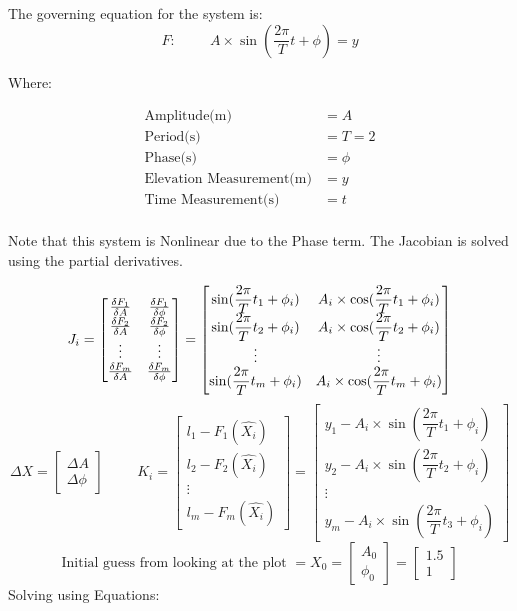 The governing equation for the system is:
\[
F:\hspace{1cm} A \times \sin(\dfrac{2\pi}{T}t + \phi) = y
\]

Where:

\begin{align*}
\text{Amplitude(m)} &= A \\
\text{Period(s)}    &= T = 2 \\
\text{Phase(s)}     &= \phi \\
\text{Elevation Measurement(m)} &= y \\
\text{Time Measurement(s)} &= t \\	
\end{align*}

Note that this system is Nonlinear due to the Phase term.  The Jacobian is solved using the partial derivatives.

\[
J_i = \begin{bmatrix}
	\frac{\delta F_1}{\delta A} &  \frac{\delta F_1}{\delta \phi} \\
	\frac{\delta F_2}{\delta A} & \frac{\delta F_2}{\delta \phi} \\
	\vdots & \vdots \\
	\frac{\delta F_m}{\delta A} & \frac{\delta F_m}{\delta \phi} \\
\end{bmatrix}
=
\begin{bmatrix}
\sin(\dfrac{2\pi}{T}t_1 + \phi_i) & A_i \times \cos(\dfrac{2\pi}{T}t_1 + \phi_i) \\
\sin(\dfrac{2\pi}{T}t_2 + \phi_i) & A_i \times \cos(\dfrac{2\pi}{T}t_2 + \phi_i) \\
\vdots & \vdots \\
\sin(\dfrac{2\pi}{T}t_m + \phi_i) & A_i \times \cos(\dfrac{2\pi}{T}t_m + \phi_i) \\
\end{bmatrix}
\]
\[
\Delta X = 
\begin{bmatrix}
\Delta A \\ \Delta \phi
\end{bmatrix}
\hspace{1cm}
K_i = 
\begin{bmatrix}
l_1 - F_1(\hat{X_i}) \\ l_2 - F_2(\hat{X_i})\\ \vdots \\ l_m - F_m(\hat{X_i})
\end{bmatrix}
=
\begin{bmatrix}
y_1 - A_i \times \sin(\dfrac{2\pi}{T}t_1 + \phi_i) \\
y_2 - A_i \times \sin(\dfrac{2\pi}{T}t_2 + \phi_i) \\
\vdots \\
y_m - A_i \times \sin(\dfrac{2\pi}{T}t_3 + \phi_i)
\end{bmatrix}
\]
\[
\text{Initial guess from looking at the plot } = X_0 = 
\begin{bmatrix}
A_0 \\ \phi_0
\end{bmatrix}
=
\begin{bmatrix}
1.5 \\ 1
\end{bmatrix}
\]
\clearpage
Solving using Equations:


